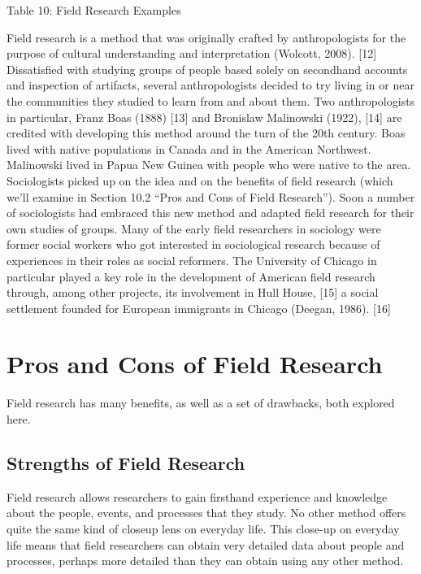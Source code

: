 Table 10: Field Research Examples

Field research is a method that was originally crafted by anthropologists for the purpose of cultural understanding and interpretation (Wolcott, 2008). [12] Dissatisfied with studying groups of people based solely on secondhand accounts and inspection of artifacts, several anthropologists decided to try living in or near the communities they studied to learn from and about them. Two anthropologists in particular, Franz Boas (1888) [13] and Bronislaw Malinowski (1922), [14] are credited with developing this method around the turn of the 20th century. Boas lived with native populations in Canada and in the American Northwest. Malinowski lived in Papua New Guinea with people who were native to the area. Sociologists picked up on the idea and on the benefits of field research (which we’ll examine in Section 10.2 ``Pros and Cons of Field Research''). Soon a number of sociologists had embraced this new method and adapted field research for their own studies of groups. Many of the early field researchers in sociology were former social workers who got interested in sociological research because of experiences in their roles as social reformers. The University of Chicago in particular played a key role in the development of American field research through, among other projects, its involvement in Hull House, [15] a social settlement founded for European immigrants in Chicago (Deegan, 1986). [16]


\section{Pros and Cons of Field Research}


Field research has many benefits, as well as a set of drawbacks, both explored here.

\subsection{Strengths of Field Research}

Field research allows researchers to gain firsthand experience and knowledge about the people, events, and processes that they study. No other method offers quite the same kind of closeup lens on everyday life. This close-up on everyday life means that field researchers can obtain very detailed data about people and processes, perhaps more detailed than they can obtain using any other method.

